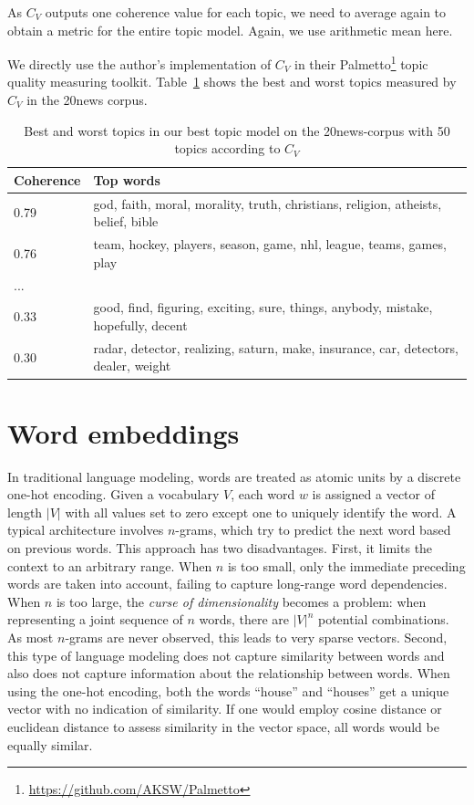 \documentclass[
        a4paper,
        titlepage,
        twoside,
        parskip
        ]{scrbook}
\theoremstyle{break}
\begin{document}
As $C_V$ outputs one coherence value for each topic, we need to average again to obtain a metric for the entire topic model.
Again, we use arithmetic mean here.

We directly use the author's implementation of $C_V$ in their Palmetto\footnote{\url{https://github.com/AKSW/Palmetto}} topic quality measuring toolkit.
Table~\ref{table:best_worst_cv_topics} shows the best and worst topics measured by $C_V$ in the 20news corpus.
\begin{table}[]
  \centering
  \caption{Best and worst topics in our best topic model on the 20news-corpus with 50 topics according to $C_V$}
  \begin{tabular}{ll}
  \hline
  \textbf{Coherence} & \textbf{Top words} \\ \hline
  0.79               & god, faith, moral, morality, truth, christians, religion, atheists, belief, bible \\
  0.76               & team, hockey, players, season, game, nhl, league, teams, games, play \\
  ...                &                    \\
  0.33               & good, find, figuring, exciting, sure, things, anybody, mistake, hopefully, decent \\
  0.30               & radar, detector, realizing, saturn, make, insurance, car, detectors, dealer, weight \\ \hline
  \end{tabular}
  \label{table:best_worst_cv_topics}
\end{table}

\section{Word embeddings}

In traditional language modeling, words are treated as atomic units by a discrete one-hot encoding.
Given a vocabulary $V$, each word $w$ is assigned a vector of length $|V|$ with all values set to zero except one to uniquely identify the word.
A typical architecture involves $n$-grams, which try to predict the next word based on previous words.
This approach has two disadvantages.
First, it limits the context to an arbitrary range.
When $n$ is too small, only the immediate preceding words are taken into account, failing to capture long-range word dependencies.
When $n$ is too large, the \emph{curse of dimensionality} becomes a problem: when representing a joint sequence of $n$ words, there are $|V|^n$ potential combinations.
As most $n$-grams are never observed, this leads to very sparse vectors.
Second, this type of language modeling does not capture similarity between words and also does not capture information about the relationship between words.
When using the one-hot encoding, both the words ``house'' and ``houses'' get a unique vector with no indication of similarity.
If one would employ cosine distance or euclidean distance to assess similarity in the vector space, all words would be equally similar.
\end{document}

